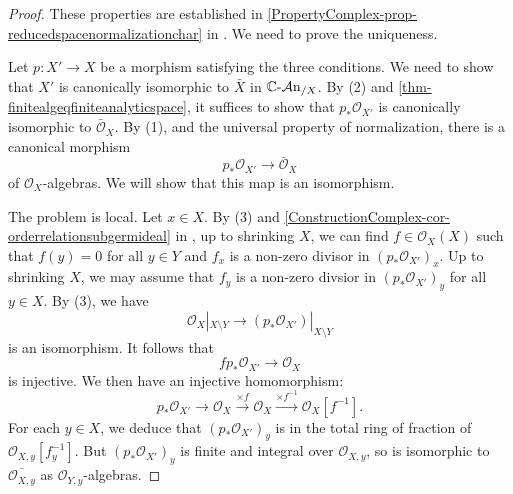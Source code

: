 \begin{proof}
    These properties are established in \cref{PropertyComplex-prop-reducedspacenormalizationchar} in . We need to prove the uniqueness.

    Let $p:X'\rightarrow X$ be a morphism satisfying the three conditions. We need to show that $X'$ is canonically isomorphic to $\bar{X}$ in $\mathbb{C}\text{-}\mathcal{A}\mathrm{n}_{/X}$.
    By (2) and \cref{thm-finitealgeqfiniteanalyticspace}, it suffices to show that $p_*\mathcal{O}_{X'}$ is canonically isomorphic to $\bar{\mathcal{O}}_{X}$. By (1), and the universal property of normalization, there is a canonical morphism
    \[
        p_*\mathcal{O}_{X'}\rightarrow \bar{\mathcal{O}}_{X}
    \]
    of $\mathcal{O}_X$-algebras. We will show that this map is an isomorphism.

    The problem is local. Let $x\in X$. By (3) and \cref{ConstructionComplex-cor-orderrelationsubgermideal} in , up to shrinking $X$, we can find $f\in \mathcal{O}_X(X)$ such that $f(y)=0$ for all $y\in Y$ and $f_x$ is a non-zero divisor in $(p_*\mathcal{O}_{X'})_x$. Up to shrinking $X$, we may assume that $f_y$ is a non-zero divsior in $(p_*\mathcal{O}_{X'})_y$ for all $y\in X$. By (3), we have
    \[
        \mathcal{O}_X|_{X\setminus Y}\rightarrow (p_*\mathcal{O}_{X'})|_{X\setminus Y}  
    \]
    is an isomorphism. It follows that 
    \[
        f p_*\mathcal{O}_{X'}\rightarrow \mathcal{O}_X  
    \]
    is injective. We then have an injective homomorphism:
    \[
        p_*\mathcal{O}_{X'}\rightarrow \mathcal{O}_X \xrightarrow{\times f} \mathcal{O}_X\xrightarrow{\times f^{-1}}\mathcal{O}_X[f^{-1}]. 
    \]
    For each $y\in X$, we deduce that $(p_*\mathcal{O}_{X'})_y$ is in the total ring of fraction of $\mathcal{O}_{X,y}[f_y^{-1}]$. But $(p_*\mathcal{O}_{X'})_y$ is finite and integral over $\mathcal{O}_{X,y}$, so is isomorphic to $\overline{\mathcal{O}_{X,y}}$ as $\mathcal{O}_{Y,y}$-algebras. 
\end{proof}

